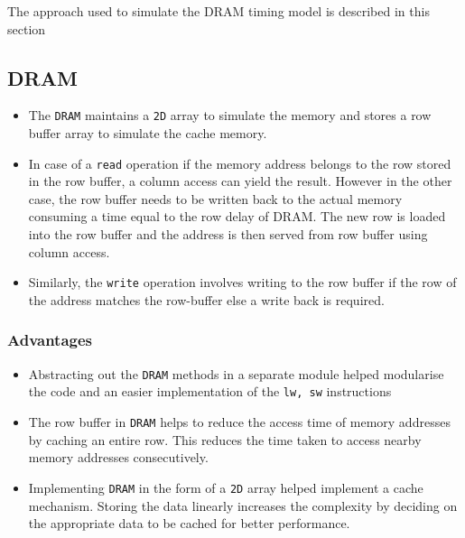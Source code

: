 \documentclass[hidelinks,12pt]{article}
\begin{document}
The approach used to simulate the DRAM timing model is described in this section

\subsection{DRAM}
\begin{itemize}
    \item The \verb|DRAM| maintains a \verb|2D| array to simulate the memory and stores a row buffer array to simulate the cache memory.
    \item In case of a \verb|read| operation if the memory address belongs to the row stored in the row buffer, a column access can yield the result.
          However in the other case, the row buffer needs to be written back to the actual memory consuming a time equal to the row delay of DRAM. The new row is loaded into the row buffer and the address is then served from row buffer using column access.
    \item Similarly, the \verb|write| operation involves writing to the row buffer if the row of the address matches the row-buffer else a write back is required.
\end{itemize}

\subsubsection{Advantages}
\begin{itemize}
    \item Abstracting out the \verb|DRAM| methods in a separate module helped modularise the code and an easier implementation of the \verb|lw, sw| instructions
    \item The row buffer in \verb|DRAM| helps to reduce the access time of memory addresses by caching an entire row. This reduces the time taken to access nearby memory addresses consecutively.
    \item Implementing \verb|DRAM| in the form of a \verb|2D| array helped implement a cache mechanism. Storing the data linearly increases the complexity by deciding on the appropriate data to be cached for better performance.
\end{itemize}
\end{document}
